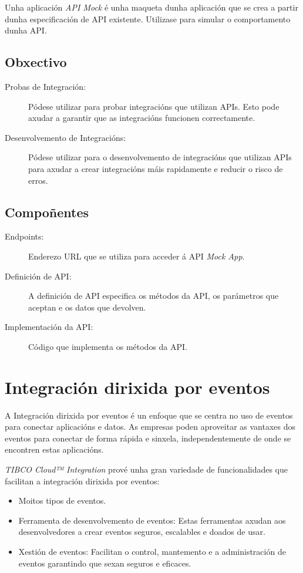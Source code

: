 Unha aplicación \textit{API Mock} é unha maqueta dunha aplicación que se crea a partir dunha especificación de API existente. Utilizase para simular o comportamento dunha API. 

\subsection{Obxectivo}

\begin{description}
    \item[Probas de Integración:] Pódese utilizar para probar integracións que utilizan APIs. Esto pode axudar a garantir que as integracións funcionen correctamente.
    \item[Desenvolvemento de Integracións:] Pódese utilizar para o desenvolvemento de integracións que utilizan APIs para axudar a crear integracións máis rapidamente e reducir o risco de erros.
\end{description}

\subsection{Compoñentes}

\begin{description}
    \item[Endpoints:] Enderezo URL que se utiliza para acceder á API \textit{Mock App}.
    \item[Definición de API:] A definición de API especifica os métodos da API, os parámetros que aceptan e os datos que devolven.
    \item[Implementación da API:] Código que implementa os métodos da API.
\end{description}

\section{Integración dirixida por eventos}

A Integración dirixida por eventos é un enfoque que se centra no uso de eventos para conectar aplicacións e datos. As empresas poden aproveitar as vantaxes dos eventos para conectar de forma rápida e sinxela, independentemente de onde se encontren estas aplicacións.

\textit{TIBCO Cloud™ Integration} prové unha gran variedade de funcionalidades que facilitan a integración dirixida por eventos:

\begin{itemize}
    \item Moitos tipos de eventos.
    \item Ferramenta de desenvolvemento de eventos: Estas ferramentas axudan aos desenvolvedores a crear eventos seguros, escalables e doados de usar.
    \item Xestión de eventos: Facilitan o control, mantemento e a administración de eventos garantindo que sexan seguros e eficaces.
\end{itemize}

